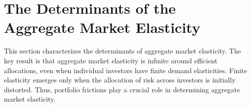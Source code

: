 \documentclass[12pt,english]{article}
\begin{document}

% 
\section{The Determinants of the Aggregate Market Elasticity}\label{sec:elasticity}

This section characterizes the determinants of aggregate market elasticity.
The key result is that aggregate market elasticity is infinite around efficient allocations, even when individual investors have finite demand elasticities.
Finite elasticity emerges only when the allocation of risk across investors is initially distorted.
Thus, portfolio frictions play a crucial role in determining aggregate market elasticity.
\end{document}
